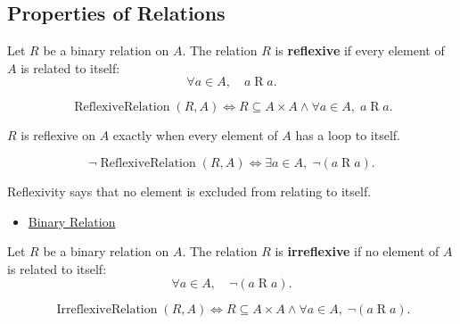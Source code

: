 \subsection*{Properties of Relations}
\label{subsec:properties-of-relations}

\begin{definition}
\label{def:rel-reflexive}
Let $R$ be a binary relation on $A$.
The relation $R$ is \textbf{reflexive} if every element of $A$ is related to
itself:
\[
\forall a \in A,\quad a \mathrel{R} a.
\]
\end{definition}

\begin{remark*}
\[
\operatorname{ReflexiveRelation}(R,A)
\Longleftrightarrow
R\subseteq A\times A
\land
\forall a\in A,\; a\mathrel{R}a.
\]
\end{remark*}

\begin{remark*}
$R$ is reflexive on $A$ exactly when every element of $A$ has a loop to itself.
\end{remark*}

\begin{remark*}
\[
\neg\operatorname{ReflexiveRelation}(R,A)
\Longleftrightarrow
\exists a\in A,\; \lnot(a\mathrel{R}a).
\]
\end{remark*}

\begin{remark*}[Interpretation]
Reflexivity says that no element is excluded from relating to itself.
\end{remark*}

\begin{dependencies}
\begin{itemize}
  \item \hyperref[def:binary-relation]{Binary Relation}
\end{itemize}
\end{dependencies}

\begin{definition}
\label{def:rel-irreflexive}
Let $R$ be a binary relation on $A$.
The relation $R$ is \textbf{irreflexive} if no element of $A$ is related to
itself:
\[
\forall a \in A,\quad \lnot(a \mathrel{R} a).
\]
\end{definition}

\begin{remark*}
\[
\operatorname{IrreflexiveRelation}(R,A)
\Longleftrightarrow
R\subseteq A\times A
\land
\forall a\in A,\; \lnot(a\mathrel{R}a).
\]
\end{remark*}

